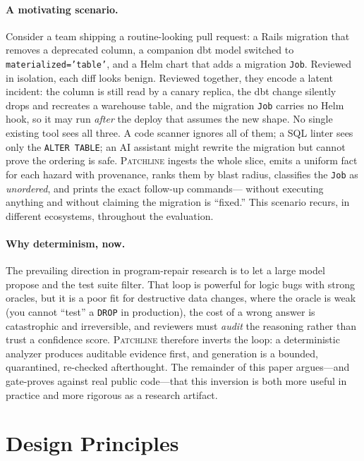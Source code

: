 \documentclass[11pt]{article}
\newcommand{\tool}{\textsc{Patchline}}
\newcommand{\code}[1]{\texttt{#1}}
\begin{document}
\paragraph{A motivating scenario.} Consider a team shipping a routine-looking pull request: a Rails
migration that removes a deprecated column, a companion dbt model switched to
\code{materialized='table'}, and a Helm chart that adds a migration \code{Job}. Reviewed in isolation,
each diff looks benign. Reviewed together, they encode a latent incident: the column is still read by a
canary replica, the dbt change silently drops and recreates a warehouse table, and the migration
\code{Job} carries no Helm hook, so it may run \emph{after} the deploy that assumes the new shape. No
single existing tool sees all three. A code scanner ignores all of them; a SQL linter sees only the
\code{ALTER TABLE}; an AI assistant might rewrite the migration but cannot prove the ordering is safe.
\tool{} ingests the whole slice, emits a uniform fact for each hazard with provenance, ranks them by
blast radius, classifies the \code{Job} as \emph{unordered}, and prints the exact follow-up commands---
without executing anything and without claiming the migration is ``fixed.'' This scenario recurs, in
different ecosystems, throughout the evaluation.

\paragraph{Why determinism, now.} The prevailing direction in program-repair research is to let a
large model propose and the test suite filter. That loop is powerful for logic bugs with strong
oracles, but it is a poor fit for destructive data changes, where the oracle is weak (you cannot
``test'' a \code{DROP} in production), the cost of a wrong answer is catastrophic and irreversible, and
reviewers must \emph{audit} the reasoning rather than trust a confidence score. \tool{} therefore
inverts the loop: a deterministic analyzer produces auditable evidence first, and generation is a
bounded, quarantined, re-checked afterthought. The remainder of this paper argues---and gate-proves
against real public code---that this inversion is both more useful in practice and more rigorous as a
research artifact.

\section{Design Principles}
\end{document}
